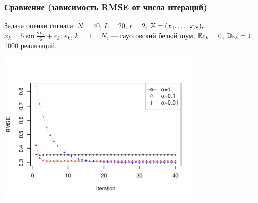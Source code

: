 \documentclass[unicode, notheorems]{beamer}
\begin{document}
\begin{frame}
	\frametitle{Сравнение (зависимость RMSE от числа итераций)}
	Задача оценки сигнала: $N = 40$, $L = 20$, $r = 2$, $\mathbb{X} = (x_{1}, \ldots, x_N),$  $x_k = 5\sin{\frac{2 k \pi}{6}} + \varepsilon_k$; $\varepsilon_k$, $k = 1, \ldots N$, --- гауссовский белый шум, $\mathbb{E} \varepsilon_k = 0$, $\mathbb{D} \varepsilon_k = 1$, 1000 реализаций.
	
	\vspace{-1cm}
	\begin{center}
		\includegraphics*[width = 10cm]{cadzowspeed_3.pdf}
	\end{center}
\end{frame}

%	

	
\end{document}
